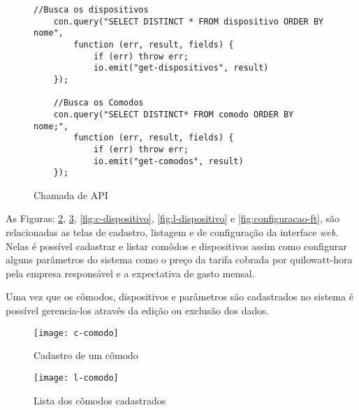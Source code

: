 \addtocounter{footnote}{0}

\begin{figure}[!ht]  
  \begin{lstlisting}[gobble=2]
	//Busca os dispositivos    
	con.query("SELECT DISTINCT * FROM dispositivo ORDER BY nome", 
		function (err, result, fields) {
        	if (err) throw err;
        	io.emit("get-dispositivos", result)
	});
	
    //Busca os Comodos    
	con.query("SELECT DISTINCT* FROM comodo ORDER BY nome;", 
		function (err, result, fields) {
        	if (err) throw err;
        	io.emit("get-comodos", result)
    });
  \end{lstlisting}
  \caption[Chamada de API]{Chamada de API}
  \label{fig:api-ft}
\end{figure}
\FloatBarrier


As Figuras: \ref{fig:c-comodo}, \ref{fig:l-comodo}, \ref{fig:c-dispositivo}, \ref{fig:l-dispositivo} e \ref{fig:configuracao-ft}, 
são relacionadas as telas de cadastro, listagem e de configuração da interface \textit{web}. Nelas é possível cadastrar e listar comôdos e dispositivos assim como 
configurar alguns parâmetros do sistema como o preço da tarifa cobrada por quilowatt-hora pela empresa responsável e a expectativa de gasto mensal.

Uma vez que os cômodos, dispositivos e parâmetros são cadastrados no sistema é possível gerencia-los através da edição ou exclusão dos dados.

\begin{figure}[h!]
	\texttt{[image: c-comodo]}
	\centering
	\caption[Cadastro de um cômodo]{Cadastro de um cômodo}
	\label{fig:c-comodo}
\end{figure}
\FloatBarrier

\begin{figure}[h!]
	\texttt{[image: l-comodo]}
	\centering
	\caption[Lista dos cômodos cadastrados]{Lista dos cômodos cadastrados}
	\label{fig:l-comodo}
\end{figure}
\FloatBarrier

